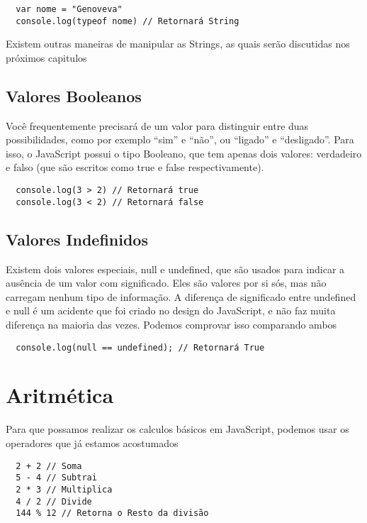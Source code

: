 \begin{lstlisting}
  var nome = "Genoveva"
  console.log(typeof nome) // Retornará String
\end{lstlisting}

Existem outras maneiras de manipular as Strings, as quais serão discutidas nos próximos capitulos

\subsection{Valores Booleanos}

Você frequentemente precisará de um valor para distinguir entre duas possibilidades, como por exemplo “sim” e “não”, ou “ligado” e “desligado”. Para isso, o JavaScript possui o tipo Booleano, que tem apenas dois valores: verdadeiro e falso (que são escritos como true e false respectivamente).

\begin{lstlisting}
  console.log(3 > 2) // Retornará true
  console.log(3 < 2) // Retornará false
\end{lstlisting}

\subsection{Valores Indefinidos}

Existem dois valores especiais, null e undefined, que são usados para indicar a ausência de um valor com significado. Eles são valores por si sós, mas não carregam nenhum tipo de informação. A diferença de significado entre undefined e null é um acidente que foi criado no design do JavaScript, e não faz muita diferença na maioria das vezes. Podemos comprovar isso comparando ambos

\begin{lstlisting}
  console.log(null == undefined); // Retornará True
\end{lstlisting}

\section{Aritmética}

Para que possamos realizar os calculos básicos em JavaScript, podemos usar os operadores que já estamos acostumados

\begin{lstlisting}
  2 + 2 // Soma
  5 - 4 // Subtrai
  2 * 3 // Multiplica
  4 / 2 // Divide
  144 % 12 // Retorna o Resto da divisão
\end{lstlisting}

